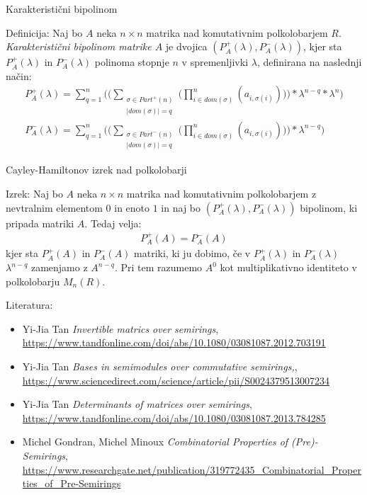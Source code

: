 \documentclass[t, 10pt]{beamer} %
\newcommand{\abs}[1]{\ensuremath{\lvert #1 \rvert}}
\newcommand{\pojem}[1]{\emph{#1}}
\newcommand{\fillblack}[1]{
\begin{tikzpicture}[remember picture, overlay]
    \node [shift={(0 cm,0cm)}]  at (current page.south west)
        {%
        \begin{tikzpicture}[remember picture, overlay] at (current page.south west)
            \draw [fill=black] (0, 0) -- (0,#1 \paperheight) --
                              (\paperwidth,#1 \paperheight) -- (\paperwidth,0) -- cycle ;
        \end{tikzpicture}
        };
        \draw (current page.north west) rectangle (current page.south east);
\end{tikzpicture}
}
\begin{document}
\begin{frame}{Karakteristični bipolinom}
	\begin{block}{Definicija:}
		Naj bo $A$ neka $n\times n$ matrika nad komutativnim polkolobarjem $R$. \pojem{Karakteristični bipolinom matrike $A$} je dvojica $(P^{+}_A(\lambda), P^{-}_A(\lambda))$, kjer sta $P^{+}_A(\lambda)$ in $P^{-}_A(\lambda)$ polinoma stopnje $n$ v spremenljivki $\lambda$, definirana na naslednji način:
		\begin{align*}
			P^{+}_A(\lambda) = \sum_{q = 1}^{n}\bigg(\bigg( \sum_{\substack{\sigma\in Part^{+}(n) \\ \abs{dom(\sigma)} = q}} \bigg(\prod_{i\in dom(\sigma)}^{n} (a_{i, \sigma(i)})\bigg)\bigg) *\lambda^{n-q} *\lambda^n \bigg) \\
			P^{-}_A(\lambda) = \sum_{q = 1}^{n}\bigg(\bigg( \sum_{\substack{\sigma\in Part^{-}(n) \\ \abs{dom(\sigma)} = q}} \bigg(\prod_{i\in dom(\sigma)}^{n} (a_{i, \sigma(i)})\bigg)\bigg) *\lambda^{n-q}\bigg)
		\end{align*}
	\end{block}
\end{frame}

\begin{frame}{Cayley-Hamiltonov izrek nad polkolobarji}
	\begin{block}{Izrek:}
		Naj bo $A$ neka $n\times n$ matrika nad komutativnim polkolobarjem z nevtralnim elementom $0$ in enoto $1$ in naj bo $(P^{+}_A(\lambda), P^{-}_A(\lambda))$ bipolinom, ki pripada matriki $A$. Tedaj velja: \begin{align}
			P^{+}_A(A) = P^{-}_A(A)
		\end{align}
		kjer sta $P^{+}_A(A)$ in $P^{-}_A(A)$ matriki, ki ju dobimo, če v $P^{+}_A(\lambda)$ in $P^{-}_A(\lambda)$ $\lambda^{n-q}$ zamenjamo z $A^{n-q}$. Pri tem razumemo $A^0$ kot multiplikativno identiteto v polkolobarju $M_n(R)$.
	\end{block}
\end{frame}

\begin{frame}{Literatura:}
	\begin{itemize}
		\item Yi-Jia Tan {\em Invertible matrics over semirings}, \url{https://www.tandfonline.com/doi/abs/10.1080/03081087.2012.703191}
%		
		\item Yi-Jia Tan {\em Bases in semimodules over commutative semirings,},	\url{https://www.sciencedirect.com/science/article/pii/S0024379513007234}
		
		\item Yi-Jia Tan {\em Determinants of matrices over semirings}, \url{https://www.tandfonline.com/doi/abs/10.1080/03081087.2013.784285}
		
		\item Michel Gondran, Michel Minoux {\em Combinatorial Properties of (Pre)-Semirings}, \url{https://www.researchgate.net/publication/319772435_Combinatorial_Properties_of_Pre-Semirings}
	\end{itemize}
\end{frame}
\end{document}
